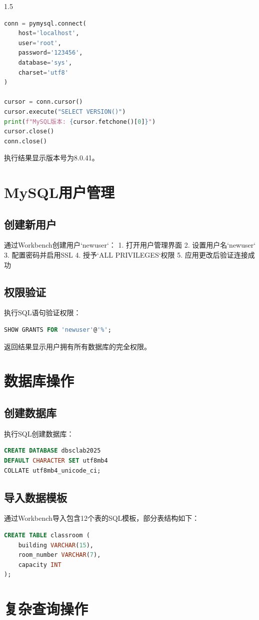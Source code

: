 \documentclass[a4paper,12pt]{report}
\begin{document}
\begin{spacing}{1.5}
\begin{lstlisting}[language=python]
conn = pymysql.connect(
    host='localhost',
    user='root',
    password='123456',
    database='sys',
    charset='utf8'
)

cursor = conn.cursor()
cursor.execute("SELECT VERSION()")
print(f"MySQL版本: {cursor.fetchone()[0]}")
cursor.close()
conn.close()
\end{lstlisting}
执行结果显示版本号为8.0.41。

\section{MySQL用户管理}
\subsection{创建新用户}
通过Workbench创建用户`newuser`：
1. 打开用户管理界面
2. 设置用户名`newuser`
3. 配置密码并启用SSL
4. 授予`ALL PRIVILEGES`权限
5. 应用更改后验证连接成功

\subsection{权限验证}
执行SQL语句验证权限：
\begin{lstlisting}[language=sql]
SHOW GRANTS FOR 'newuser'@'%';
\end{lstlisting}
返回结果显示用户拥有所有数据库的完全权限。

\section{数据库操作}
\subsection{创建数据库}
执行SQL创建数据库：
\begin{lstlisting}[language=sql]
CREATE DATABASE dbsclab2025 
DEFAULT CHARACTER SET utf8mb4 
COLLATE utf8mb4_unicode_ci;
\end{lstlisting}

\subsection{导入数据模板}
通过Workbench导入包含12个表的SQL模板，部分表结构如下：
\begin{lstlisting}[language=sql]
CREATE TABLE classroom (
    building VARCHAR(15),
    room_number VARCHAR(7),
    capacity INT
);
\end{lstlisting}

\section{复杂查询操作}

\end{spacing}
\end{document}
